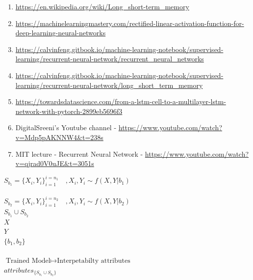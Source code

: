 \documentclass{article}
\begin{document}
\begin{enumerate}
	\item \url{https://en.wikipedia.org/wiki/Long_short-term_memory}
	\item \url{https://machinelearningmastery.com/rectified-linear-activation-function-for-deep-learning-neural-networks}
	\item \url{	https://calvinfeng.gitbook.io/machine-learning-notebook/supervised-learning/recurrent-neural-network/recurrent_neural_networks}
	\item \url{https://calvinfeng.gitbook.io/machine-learning-notebook/supervised-learning/recurrent-neural-network/long_short_term_memory}
	\item \url{https://towardsdatascience.com/from-a-lstm-cell-to-a-multilayer-lstm-network-with-pytorch-2899eb5696f3}
	\item DigitalSreeni's Youtube channel - \url{https://www.youtube.com/watch?v=Mdp5pAKNNW4&t=238s}
	\item MIT lecture - Recurrent Neural Network - \url{https://www.youtube.com/watch?v=qjrad0V0uJE&t=3051s}
\end{enumerate}



$S_{b_1} = \big\{X_i, Y_i\big\}_{i=1}^{i=n_1}\quad , X_i,Y_i \sim f(X,Y| b_1) $  \\ \\
$S_{b_2} = \big\{X_i, Y_i\big\}_{i=1}^{i=n_2}\quad , X_i,Y_i \sim f(X,Y| b_2) $ \\

$S_{b_1} \cup S_{b_2}$ \\

$X$ \\ $Y$ \\ $ \big\{b_1, b_2\big\}$ \\ \\ 

$\text{Trained Model} \mapsto \text{Interpetabilty attributes}$ \\
$attributes_{\{S_{b_1} \cup S_{b_2}\}}$

	
\newpage




\nocite{*}
\printbibliography
\end{document}

